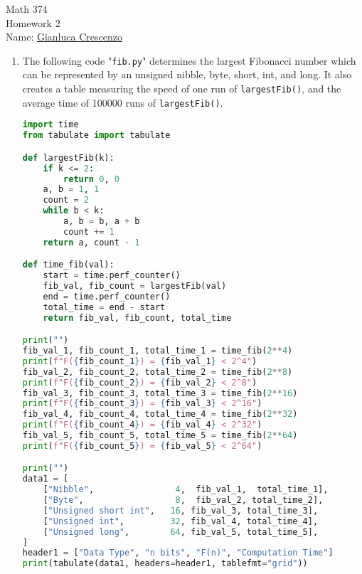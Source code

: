 \documentclass[11pt,twoside,openany]{memoir}
\begin{document}
\begin{center}
{\large Math 374 \\[0.1in]Homework 2 \\[0.1in]}
{Name:} {\underline{Gianluca Crescenzo\hspace*{2in}}}\\[0.15in]
\end{center}
\vspace{4pt}
    \begin{enumerate}[label = (\roman*),itemsep=1pt,topsep=3pt]
        \item The following code "\texttt{fib.py}" determines the largest Fibonacci number which can be represented by an unsigned nibble, byte, short, int, and long. It also creates a table measuring the speed of one run of \texttt{largestFib()}, and the average time of 100000 runs of \texttt{largestFib()}.
            \begin{lstlisting}[language=Python, basicstyle=\ttfamily\tiny,]
import time
from tabulate import tabulate

def largestFib(k):
    if k <= 2:
        return 0, 0
    a, b = 1, 1
    count = 2
    while b < k:
        a, b = b, a + b
        count += 1
    return a, count - 1

def time_fib(val):
    start = time.perf_counter()
    fib_val, fib_count = largestFib(val)
    end = time.perf_counter()
    total_time = end - start
    return fib_val, fib_count, total_time

print("")
fib_val_1, fib_count_1, total_time_1 = time_fib(2**4)
print(f"F({fib_count_1}) = {fib_val_1} < 2^4")
fib_val_2, fib_count_2, total_time_2 = time_fib(2**8)
print(f"F({fib_count_2}) = {fib_val_2} < 2^8")
fib_val_3, fib_count_3, total_time_3 = time_fib(2**16)
print(f"F({fib_count_3}) = {fib_val_3} < 2^16")
fib_val_4, fib_count_4, total_time_4 = time_fib(2**32)
print(f"F({fib_count_4}) = {fib_val_4} < 2^32")
fib_val_5, fib_count_5, total_time_5 = time_fib(2**64)
print(f"F({fib_count_5}) = {fib_val_5} < 2^64")

print("")
data1 = [
    ["Nibble",                4,  fib_val_1,  total_time_1],
    ["Byte",                  8,  fib_val_2, total_time_2],
    ["Unsigned short int",   16, fib_val_3, total_time_3],
    ["Unsigned int",         32, fib_val_4, total_time_4],
    ["Unsigned long",        64, fib_val_5, total_time_5],
]
header1 = ["Data Type", "n bits", "F(n)", "Computation Time"]
print(tabulate(data1, headers=header1, tablefmt="grid"))


\end{lstlisting}
\end{enumerate}
\end{document}
